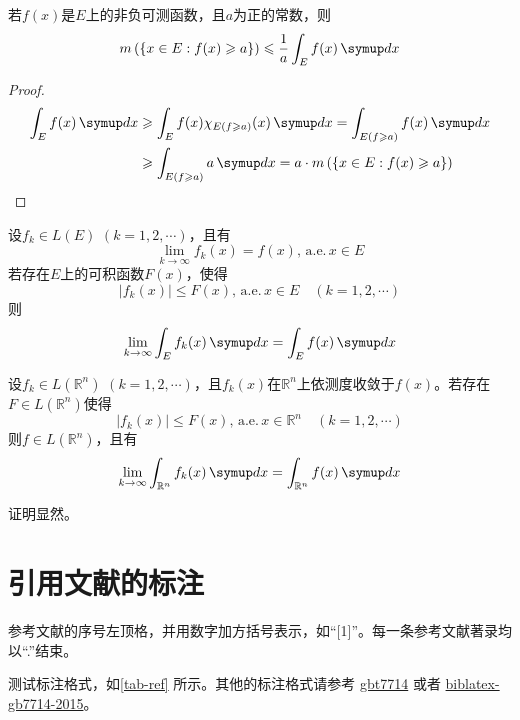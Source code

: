 \begin{lemma}
    若\(f(x)\)是\(E\)上的非负可测函数，且\(a\)为正的常数，则
    \[m\left(\left\{x\in E : f(x) \geqslant a\right\}\right)\leqslant \frac{1}{a}\int_{E} f(x)\diff x\]
\end{lemma}

\begin{proof}
    \begin{align*}
        \int_E f(x)\diff x & \geqslant \int_E f(x)\chi_{E\left(f \geqslant a\right)}(x)\diff x = \int_{E\left(f \geqslant a\right)} f(x)\diff x            \\
                           & \geqslant \int_{E\left(f\geqslant a\right)} a\diff x = a\cdot m\left(\left\{x\in E : f(x) \geqslant a\right\}\right) \qedhere
    \end{align*}
\end{proof}

\begin{theorem}[控制收敛定理]
    设\(f_k\in L(E)\) \((k = 1,2,\cdots)\)，且有
    \[\lim_{k\to\infty}f_k(x) = f(x), \,\text{a.e.}\, x\in E\]
    若存在\(E\)上的\textsf{可积}函数\(F(x)\)，使得
    \[\left\vert f_k(x)\right\vert\leqslant F(x),\,\text{a.e.}\, x\in E\quad (k = 1,2,\cdots)\]
    则
    \[\lim_{k\to\infty} \int_E f_k(x)\diff x = \int_E f(x)\diff x\]
\end{theorem}

\begin{corollary}[依测度收敛型控制收敛定理]
    设\(f_k\in L(\mathbb{R}^n)\) \((k = 1,2,\cdots)\)，且\(f_k(x)\)在\(\mathbb{R}^n\)上依测度收敛于\(f(x)\)。若存在\(F\in L(\mathbb{R}^n)\)使得
    \[\left\vert f_k(x)\right\vert \leqslant F(x),\,\text{a.e.}\, x\in\mathbb{R}^n \quad (k = 1,2,\cdots)\]
    则\(f\in L(\mathbb{R}^n)\)，且有
    \[\lim_{k\to\infty}\int_{\mathbb{R}^n} f_k(x)\diff x = \int_{\mathbb{R}^n} f(x)\diff x\]
\end{corollary}

\begin{remark}
    证明显然。
\end{remark}

\section{引用文献的标注}

参考文献的序号左顶格，并用数字加方括号表示，如“[1]”。每一条参考文献著录均以“.”结束。

测试标注格式，如\autoref{tab-ref} 所示。其他的标注格式请参考 \href{http://mirrors.ctan.org/biblio/bibtex/contrib/gbt7714/gbt7714.pdf}{gbt7714} 或者
\href{http://mirrors.ctan.org/macros/latex/contrib/biblatex-contrib/biblatex-gb7714-2015/biblatex-gb7714-2015.pdf}{biblatex-gb7714-2015}。


